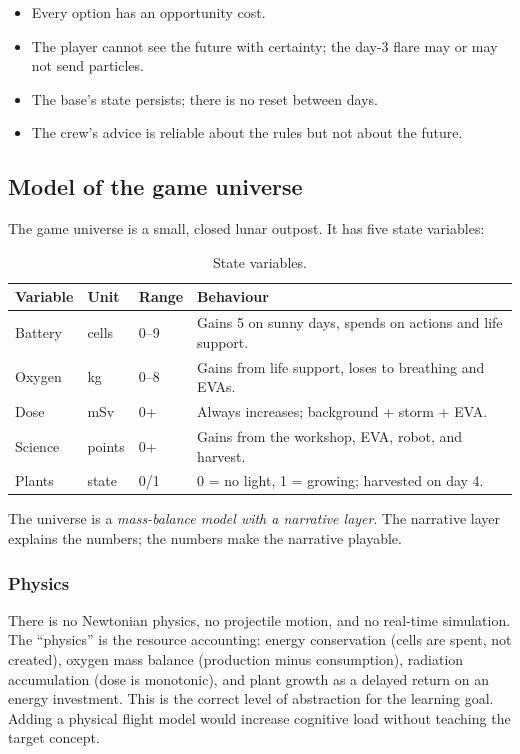 \documentclass[11pt,a4paper]{article}
\begin{document}
\begin{itemize}
  \item Every option has an opportunity cost.
  \item The player cannot see the future with certainty; the day-3 flare may or may not send particles.
  \item The base's state persists; there is no reset between days.
  \item The crew's advice is reliable about the rules but not about the future.
\end{itemize}

\subsection{Model of the game universe}

The game universe is a small, closed lunar outpost. It has five state variables:

\begin{table}[H]
\centering
\small
\begin{tabular}{@{}p{2.4cm}p{1.6cm}p{1.8cm}p{8.4cm}@{}}
\toprule
\textbf{Variable} & \textbf{Unit} & \textbf{Range} & \textbf{Behaviour}\\
\midrule
Battery & cells & 0--9 & Gains 5 on sunny days, spends on actions and life support.\\
Oxygen & kg & 0--8 & Gains from life support, loses to breathing and EVAs.\\
Dose & mSv & 0+ & Always increases; background + storm + EVA.\\
Science & points & 0+ & Gains from the workshop, EVA, robot, and harvest.\\
Plants & state & 0/1 & 0 = no light, 1 = growing; harvested on day 4.\\
\bottomrule
\end{tabular}
\caption{State variables.}
\label{tab:state}
\end{table}

The universe is a \emph{mass-balance model with a narrative layer}. The narrative layer explains the numbers; the numbers make the narrative playable.

\subsubsection*{Physics}

There is no Newtonian physics, no projectile motion, and no real-time simulation. The ``physics'' is the resource accounting: energy conservation (cells are spent, not created), oxygen mass balance (production minus consumption), radiation accumulation (dose is monotonic), and plant growth as a delayed return on an energy investment. This is the correct level of abstraction for the learning goal. Adding a physical flight model would increase cognitive load without teaching the target concept.
\end{document}

